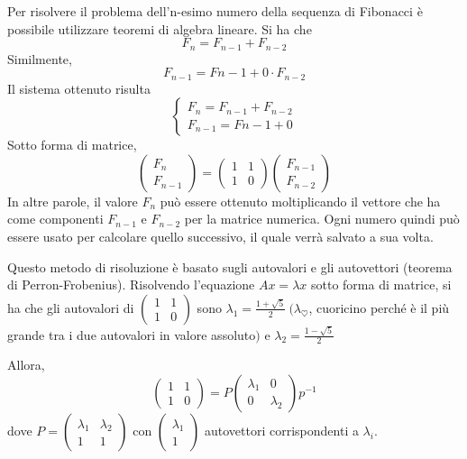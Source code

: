 Per risolvere il problema dell'n-esimo numero della sequenza di Fibonacci è possibile utilizzare teoremi di algebra lineare.
Si ha che
$$F_n = F_{n-1} + F_{n-2}$$
Similmente, 
$$F_{n-1} = F{n-1} + 0 \cdot F_{n-2}$$
Il sistema ottenuto risulta
$$\begin{cases}
	F_n = F_{n-1} + F_{n-2} \\
	F_{n-1} = F{n-1} + 0
\end{cases}$$
Sotto forma di matrice,
$$\begin{pmatrix}
F_n \\ F_{n-1}
\end{pmatrix}
=
\begin{pmatrix}
1 & 1 \\ 1 & 0
\end{pmatrix}
\begin{pmatrix}
F_{n-1} \\ F_{n-2}
\end{pmatrix}$$
In altre parole, il valore $F_n$ può essere ottenuto moltiplicando il vettore che ha come componenti $F_{n-1}$ e $F_{n-2}$ per la matrice numerica. Ogni numero quindi può essere usato per calcolare quello successivo, il quale verrà salvato a sua volta. \par
Questo metodo di risoluzione è basato sugli autovalori e gli autovettori (teorema di Perron-Frobenius). Risolvendo l'equazione $Ax = \lambda x$ sotto forma di matrice, si ha che gli autovalori di $\begin{pmatrix}
    1 & 1 \\ 1 & 0
\end{pmatrix}$ sono $\lambda_1 = \frac{1 + \sqrt{5}}{2}\ (\lambda_\heartsuit$, cuoricino perché è il più grande tra i due autovalori in valore assoluto$)$ e $\lambda_2 = \frac{1 - \sqrt{5}}{2}$ \par 
Allora, $$\begin{pmatrix}
    1 & 1 \\ 1 & 0
\end{pmatrix} = P \begin{pmatrix}
    \lambda_1 & 0 \\ 0 & \lambda_2
\end{pmatrix} p^{-1}$$
dove $P = \begin{pmatrix}
    \lambda_1 & \lambda_2 \\ 1 & 1
\end{pmatrix}$ con $\begin{pmatrix}
    \lambda_1 \\ 1
\end{pmatrix}$ autovettori corrispondenti a $\lambda_i$. \par 
